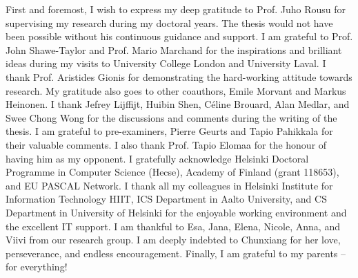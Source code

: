 

\begin{preface}[Espoo]

%
First and foremost, I wish to express my deep gratitude to Prof. Juho Rousu for supervising my research during my doctoral years.
The thesis would not have been possible without his continuous guidance and support. 
%
I am grateful to Prof. John Shawe-Taylor and Prof. Mario Marchand for the inspirations and brilliant ideas during my visits to University College London and University Laval.
%
I thank Prof. Aristides Gionis for demonstrating the hard-working attitude towards research.
My gratitude also goes to other coauthors, Emile Morvant and Markus Heinonen. 
%
I thank Jefrey Lijffijt, Huibin Shen, C\'eline Brouard, Alan Medlar, and Swee Chong Wong for the discussions and comments during the writing of the thesis.
I am grateful to pre-examiners, Pierre Geurts and Tapio Pahikkala for their valuable comments.
I also thank Prof. Tapio Elomaa for the honour of having him as my opponent.
%
I gratefully acknowledge Helsinki Doctoral Programme in Computer Science (Hecse), Academy of Finland (grant 118653), and EU PASCAL Network.
% 
I thank all my colleagues in Helsinki Institute for Information Technology HIIT, ICS Department in Aalto University, and CS Department in University of Helsinki for the enjoyable working environment and the excellent IT support.
%
I am thankful to Esa, Jana, Elena, Nicole, Anna, and Viivi from our research group.
%
%
I am deeply indebted to Chunxiang for her love, perseverance, and endless encouragement.
%
Finally, I am grateful to my parents -- for everything! 


\end{preface}
